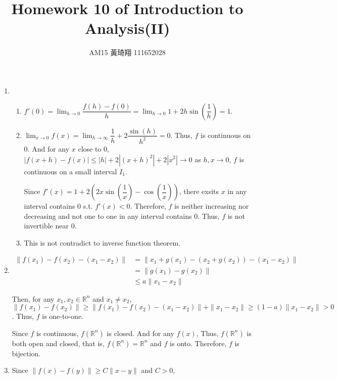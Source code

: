 \documentclass[12pt]{article}
\title{Homework 10 of Introduction to Analysis(II)}
\author{AM15 黃琦翔 111652028}
\begin{document}
\maketitle
\begin{enumerate}
    \item \begin{enumerate}
        \item $f'(0) = \displaystyle\lim_{h\to 0} \dfrac{f(h) - f(0)}{h} = \displaystyle\lim_{h\to 0} 1 + 2h\sin(\dfrac{1}{h}) = 1$.
        
        \item $\displaystyle\lim_{x\to 0} f(x) = \displaystyle\lim_{h\to \infty} \dfrac{1}{h} + 2\dfrac{\sin(h)}{h^2} = 0$.
        Thus, $f$ is continuous on $0$.
        And for any $x$ close to $0$, $|f(x+h) - f(x)| \leq |h| + 2|(x+h)^2| + 2|x^2| \to 0$ as $h, x \to 0$, $f$ is continuous on a small interval $I_1$.

        Since $f'(x) = 1 + 2(2x\sin(\dfrac{1}{x}) - \cos(\dfrac{1}{x}))$, there exsits $x$ in any interval contains $0$ s.t. $f'(x)< 0$.
        Therefore, $f$ is neither increasing nor decreasing and not one to one in any interval contains $0$.
        Thus, $f$ is not invertible near $0$.

        \item This is not contradict to inverse function theorem.
    \end{enumerate}

    \item \begin{align*}
        \| f(x_1) - f(x_2) - (x_1 - x_2)\| &= \| x_1 + g(x_1) - (x_2 + g(x_2)) - (x_1 - x_2) \| \\
        &= \| g(x_1) - g(x_2)\|\\
        &\leq a\| x_1 - x_2\|
    \end{align*}

    Then, for any $x_1, x_2\in \mathbb{R}^n$ and $x_1 \neq x_2$, $\| f(x_1) - f(x_2)\| \geq \|f(x_1) - f(x_2) - (x_1 - x_2)\| + \| x_1 - x_2\| \geq (1-a)\|x_1 - x_2\| > 0$.
    Thus, $f$ is one-to-one.

    Since $f$ is continuous, $f(\mathbb{R}^n)$ is closed.
    And for any $f(x)$, 
    Thus, $f(\mathbb{R}^n)$ is both open and closed, that is, $f(\mathbb{R}^n) = \mathbb{R}^n$ and $f$ is onto.
    Therefore, $f$ is bijection.
   
    \item Since $\|f(x) - f(y) \| \geq C\| x-y \|$ and $C > 0$, 
    
\end{enumerate}
\end{document}
